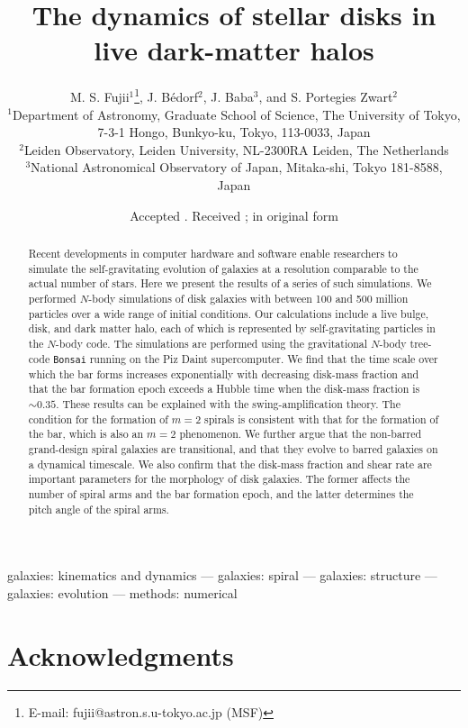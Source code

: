 \documentclass[a4paper,fleqn,usenatbib]{mnras}
\title[The dynamics of stellar disks in live halos]{The dynamics of stellar disks in live dark-matter halos}
\author[M. S. Fujii et al.]{M. S. Fujii$^{1}$\thanks{E-mail:
fujii@astron.s.u-tokyo.ac.jp (MSF)}, J. B\'edorf$^{2}$, J. Baba$^{3}$, and S. Portegies Zwart$^{2}$\\
$^{1}$Department of Astronomy, Graduate School of Science, The University of Tokyo, 7-3-1 Hongo, Bunkyo-ku, Tokyo, 113-0033, Japan\\
$^{2}$Leiden Observatory, Leiden University, NL-2300RA Leiden, The Netherlands\\
$^{3}$National Astronomical Observatory of Japan, Mitaka-shi, Tokyo 181-8588, Japan}
\date{Accepted . Received ; in original form }
\begin{document}
\label{firstpage}
\pagerange{\pageref{firstpage}--\pageref{lastpage}} 
\maketitle



\begin{abstract}

Recent developments in computer hardware and software enable
researchers to simulate the self-gravitating evolution of galaxies at
a resolution comparable to the actual number of stars.  Here we
present the results of a series of such simulations.  We performed
$N$-body simulations of disk galaxies with between 100 and 500 million
particles over a wide range of initial conditions.  Our calculations
include a live bulge, disk, and dark matter halo, each of which is
represented by self-gravitating particles in the $N$-body code.  The
simulations are performed using the gravitational $N$-body tree-code
{\tt Bonsai} running on the Piz Daint supercomputer.
We find that the time scale over which the bar forms increases
exponentially with decreasing disk-mass fraction and that the bar formation
epoch exceeds a Hubble time when the disk-mass fraction is $\sim0.35$.
These results can be explained with the swing-amplification theory.
The condition
for the formation of $m=2$ spirals is consistent with that for the
formation of the bar, which is also an $m=2$ phenomenon.  We further argue
that the non-barred grand-design spiral galaxies
are transitional, and that they evolve to barred
galaxies on a dynamical timescale.
We also confirm that the disk-mass fraction and shear rate
are important parameters for the morphology of disk galaxies.
The former affects the number of spiral arms and the bar formation
epoch, and the latter determines the pitch angle of the spiral arms.


\end{abstract}

\begin{keywords}
galaxies: kinematics and dynamics --- galaxies: spiral --- galaxies: structure ---
galaxies: evolution --- methods: numerical
\end{keywords}










\section*{Acknowledgments}
\end{document}
